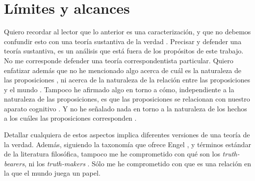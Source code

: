 \section{Límites y alcances}

\noindent Quiero recordar al lector que lo anterior es una caracterización, y que no debemos
confundir esto con una teoría sustantiva de la verdad \parencite{engel2014truth}.
Precisar y defender una teoría sustantiva, es un análisis que está fuera de los
propósitos de este trabajo. No me corresponde defender una teoría correspondentista
particular. Quiero enfatizar además que no he mencionado algo acerca de cuál es la naturaleza de las
proposiciones \parencite{sep-propositions}, ni acerca de la naturaleza de la relación
entre las proposiciones y el mundo \parencite{ramsey1927facts}. Tampoco he afirmado
algo en torno a cómo, independiente a la naturaleza de las proposiciones, es que las
proposiciones se relacionan con nuestro aparato cognitivo
\parencite{frege1918thought}. Y no he señalado nada en torno a la naturaleza de los
hechos a los cuáles las proposiciones corresponden \parencite{austin1950truth}.

Detallar cualquiera de estos aspectos implica diferentes versiones de una teoría de
la verdad. Además, siguiendo la taxonomía que ofrece Engel
\parencite{engel2014truth}, y términos estándar de la literatura filosófica, tampoco
me he comprometido con qué son los \textit{truth-bearers}, ni los
\textit{truth-makers} \parencite{sep-truth}. Sólo me he comprometido con que es una
relación en la que el mundo juega un papel.

